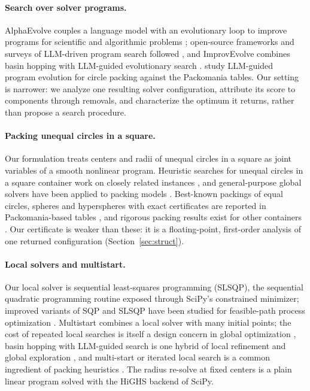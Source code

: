 \documentclass{article} %
\begin{document}
\paragraph{Search over solver programs.}
AlphaEvolve couples a language model with an evolutionary loop to improve programs for scientific and algorithmic problems \citep{Alexander2025AlphaEvolve}; open-source frameworks and surveys of LLM-driven program search followed \citep{Assumpo2026CodeEvolve,Mao2026Driven}, and ImprovEvolve combines basin hopping with LLM-guided evolutionary search \citep{Kravatskiy2026ImprovEvolve}.
\citet{Sander2026Guided} study LLM-guided program evolution for circle packing against the Packomania tables. Our setting is narrower: we analyze one resulting solver configuration, attribute its score to components through removals, and characterize the optimum it returns, rather than propose a search procedure.

\paragraph{Packing unequal circles in a square.}
Our formulation treats centers and radii of unequal circles in a square as joint variables of a smooth nonlinear program. Heuristic searches for unequal circles in a square container work on closely related instances \citep{He2016Packing}, and general-purpose global solvers have been applied to packing models \citep{Berthold2026Global}. Best-known packings of equal circles, spheres and hyperspheres with exact certificates are reported in Packomania-based tables \citep{MokiJulio2026Moki}, and rigorous packing results exist for other containers \citep{Montanher2018Rigorous}. Our certificate is weaker than these: it is a floating-point, first-order analysis of one returned configuration (Section~\ref{sec:struct}).

\paragraph{Local solvers and multistart.}
Our local solver is sequential least-squares programming (SLSQP), the sequential quadratic programming routine exposed through SciPy's constrained minimizer; improved variants of SQP and SLSQP have been studied for feasible-path process optimization \citep{Ma2024Improved}. Multistart combines a local solver with many initial points; the cost of repeated local searches is itself a design concern in global optimization \citep{Tigli2020Saving}, basin hopping with LLM-guided search is one hybrid of local refinement and global exploration \citep{Kravatskiy2026ImprovEvolve}, and multi-start or iterated local search is a common ingredient of packing heuristics \citep{Ye2013Iterated,Zhou2024Geometric}. The radius re-solve at fixed centers is a plain linear program solved with the HiGHS backend of SciPy.
\end{document}
